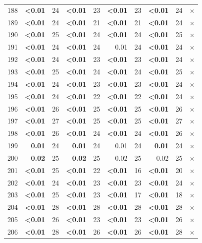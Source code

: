 \begin{longtable}{lr@{\hskip 4pt}l@{\hskip 12pt}r@{\hskip 4pt}l@{\hskip 12pt}r@{\hskip 4pt}l@{\hskip 12pt}r@{\hskip 4pt}l@{\hskip 12pt}r}
188 & \textbf{<0.01} & 24 & \textbf{<0.01} & 23 & \textbf{<0.01} & 23 & \textbf{<0.01} & 24 & $\times$ \\
189 & \textbf{<0.01} & 24 & \textbf{<0.01} & 21 & \textbf{<0.01} & 21 & \textbf{<0.01} & 24 & $\times$ \\
190 & \textbf{<0.01} & 25 & \textbf{<0.01} & 24 & \textbf{<0.01} & 24 & \textbf{<0.01} & 25 & $\times$ \\
191 & \textbf{<0.01} & 24 & \textbf{<0.01} & 24 & 0.01 & 24 & \textbf{<0.01} & 24 & $\times$ \\
192 & \textbf{<0.01} & 24 & \textbf{<0.01} & 23 & \textbf{<0.01} & 23 & \textbf{<0.01} & 24 & $\times$ \\
193 & \textbf{<0.01} & 25 & \textbf{<0.01} & 24 & \textbf{<0.01} & 24 & \textbf{<0.01} & 25 & $\times$ \\
194 & \textbf{<0.01} & 24 & \textbf{<0.01} & 23 & \textbf{<0.01} & 23 & \textbf{<0.01} & 24 & $\times$ \\
195 & \textbf{<0.01} & 24 & \textbf{<0.01} & 22 & \textbf{<0.01} & 22 & \textbf{<0.01} & 24 & $\times$ \\
196 & \textbf{<0.01} & 26 & \textbf{<0.01} & 25 & \textbf{<0.01} & 25 & \textbf{<0.01} & 26 & $\times$ \\
197 & \textbf{<0.01} & 27 & \textbf{<0.01} & 25 & \textbf{<0.01} & 25 & \textbf{<0.01} & 27 & $\times$ \\
198 & \textbf{<0.01} & 26 & \textbf{<0.01} & 24 & \textbf{<0.01} & 24 & \textbf{<0.01} & 26 & $\times$ \\
199 & \textbf{0.01} & 24 & \textbf{0.01} & 24 & 0.01 & 24 & \textbf{0.01} & 24 & $\times$ \\
200 & \textbf{0.02} & 25 & \textbf{0.02} & 25 & 0.02 & 25 & 0.02 & 25 & $\times$ \\
201 & \textbf{<0.01} & 25 & \textbf{<0.01} & 22 & \textbf{<0.01} & 16 & \textbf{<0.01} & 20 & $\times$ \\
202 & \textbf{<0.01} & 24 & \textbf{<0.01} & 23 & \textbf{<0.01} & 23 & \textbf{<0.01} & 24 & $\times$ \\
203 & \textbf{<0.01} & 25 & \textbf{<0.01} & 23 & \textbf{<0.01} & 17 & \textbf{<0.01} & 18 & $\times$ \\
204 & \textbf{<0.01} & 28 & \textbf{<0.01} & 28 & \textbf{<0.01} & 28 & \textbf{<0.01} & 28 & $\times$ \\
205 & \textbf{<0.01} & 26 & \textbf{<0.01} & 23 & \textbf{<0.01} & 23 & \textbf{<0.01} & 26 & $\times$ \\
206 & \textbf{<0.01} & 28 & \textbf{<0.01} & 26 & \textbf{<0.01} & 26 & \textbf{<0.01} & 28 & $\times$ \\

\end{longtable}
